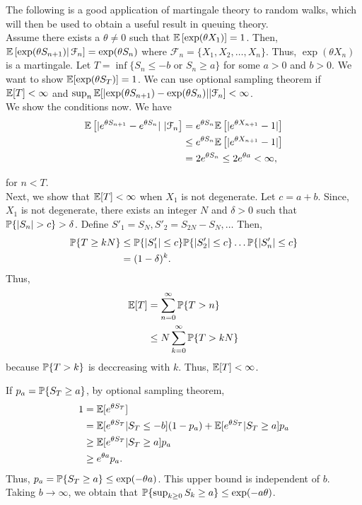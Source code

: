 \documentclass[all-lectures.tex]{subfiles}
\begin{document}
The following is a good application of martingale theory to random walks, which will then be used to obtain a useful result in queuing theory.\\
\indent Assume there exists a $\theta \neq 0$ such that $\E\left[ \exp(\theta X_{1})\right] = 1$. Then, $\E\left[ \exp(\theta S_{n+1})\right|\mathcal{F}_n] =  \exp(\theta S_{n})$ where $\mathcal{F}_n = \{X_1,X_2,\dots,X_n\}$. Thus,  $\exp(\theta X_{n})$ is a martingale. Let $T = \inf\{S_n \leq -b \text{ or } S_n \geq a\}$ for some $a>0$ and $b>0$. We want to show $\E[\exp(\theta S_T)]=1$. We can use optional sampling theorem if $\E[T] < \infty$ and $\sup_n \E[\abs{ \exp(\theta S_{n+1}) - \exp(\theta S_{n})}| \mathcal{F}_n] < \infty$. \\
\indent We show the conditions now. We have
\begin{align*}
\E \left[ \abs{ e^{\theta S_{n+1}} - e^{\theta S_{n}}}\ | \mathcal{F}_n \right]  &= e^{\theta S_n} \E\left[\abs{e^{\theta X_{n+1}} -1}  \right] \\
&\leq e^{\theta S_n} \E\left[\abs{e^{\theta X_{n+1}} -1} \right] \\
&= 2 e^{\theta S_n}  \leq 2 e^{\theta a}  < \infty,
\end{align*}

for $n < T$. \\
\indent Next, we show that $\E[T] < \infty$ when $X_1$ is not degenerate. Let $c = a+b$. Since, $X_1$ is not degenerate, there exists an integer $N$ and $\delta > 0$ such that $\P\{|S_n|>c\}>\delta$. Define $S'_1 = S_N,S'_2 = S_{2N} - S_N,\dots$ Then, 
\begin{align*}
\P\{T\geq kN\} &\leq \P\{|S'_1| \leq c\}\P\{|S'_2| \leq c\} \dots \P\{|S'_n| \leq c\} \\
&= (1-\delta)^k.
\end{align*}
Thus, 
\begin{align*}
\E[T] &= \sum_{n=0}^\infty \P\{T>n\} \\
&\leq N \sum_{k=0}^\infty \P\{T>kN\} \\
\end{align*}
because $\P\{T>k\}$ is deccreasing with $k$. Thus, $\E[T]< \infty$.



\indent If $p_a = \P\{S_T \geq a\}$, by optional sampling theorem, 
\begin{align*}
1&= \E[e^{\theta S_T}] \\
&= \E[e^{\theta S_T}|S_T \leq -b](1-p_a) + \E[e^{\theta S_T}|S_T \geq a] p_a \\
&\geq \E[e^{\theta S_T}|S_T \geq a] p_a \\
&\geq e^{\theta a} p_a.
\end{align*}
Thus, $p_a = \P\{S_T \geq a\} \leq \exp(-\theta a)$. This upper bound is independent of $b$. Taking $b\to \infty$, we obtain that $\P\{\sup_{k\geq 0} S_k \geq a\} \leq \exp(-a \theta)$.\\
\end{document}
